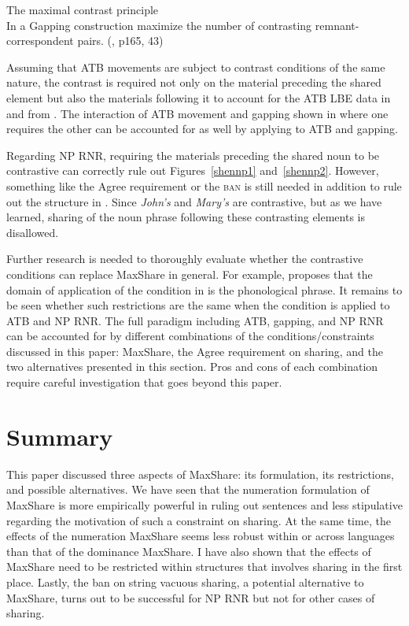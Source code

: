 \documentclass[output=paper]{langscibook}
\begin{document}
\ea 
	\label{shenMCP}
	The maximal contrast principle\\
	In a Gapping construction maximize the number of contrasting remnant-correspondent pairs. (\citealt{Hartmann:2000}, p165, 43)
	\z 


Assuming that ATB movements are subject to contrast conditions of the same nature, the contrast is required not only on the material preceding the shared element but also the materials following it to account for the ATB LBE data in  and  from \citet{Citko:2006}. The interaction of ATB movement and gapping shown in  where one requires the other can be accounted for as well by applying  to ATB and gapping. 

Regarding NP RNR, requiring the materials preceding the shared noun to be contrastive can correctly rule out Figures~\ref{shennp1} and~\ref{shennp2}. However, something like the Agree requirement or the \textsc{ban} is still needed in addition to rule out the structure in . Since \textit{John's} and \textit{Mary's} are contrastive, but as we have learned, sharing of the noun phrase following these contrasting elements is disallowed. 

Further research is needed to thoroughly evaluate whether the contrastive conditions can replace MaxShare in general. For example, \citet{Hartmann:2000} proposes that the domain of application of the condition in  is the phonological phrase. It remains to be seen whether such restrictions are the same when the condition is applied to ATB and NP RNR.  The full paradigm including ATB, gapping, and NP RNR can be accounted for by different combinations of the conditions/constraints discussed in this paper: MaxShare, the Agree requirement on sharing, and the two alternatives presented in this section. Pros and cons of each combination require careful investigation that goes beyond this paper.

\section{Summary}
\label{shensect:summary}

This paper discussed three aspects of MaxShare: its formulation, its restrictions, and possible alternatives. We have seen that the numeration formulation of MaxShare is more empirically powerful in ruling out sentences and less stipulative regarding the motivation of such a constraint on sharing. At the same time, the effects of the numeration MaxShare seems less robust within or across languages than that of the dominance MaxShare. I have also shown that the effects of MaxShare need to be restricted within structures that involves sharing in the first place. Lastly, the ban on string vacuous sharing, a potential alternative to MaxShare, turns out to be successful for NP RNR but not for other cases of sharing. 
\end{document}
